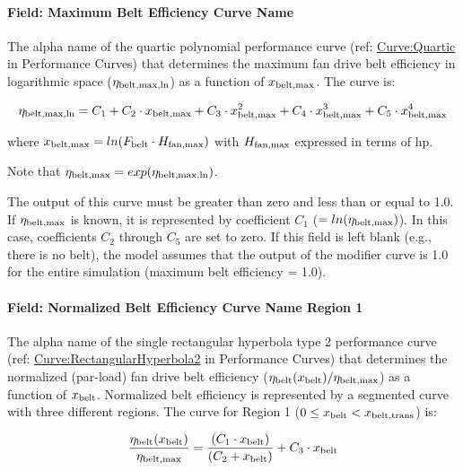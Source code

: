 \paragraph{Field: Maximum Belt Efficiency Curve Name}\label{field-maximum-belt-efficiency-curve-name}

The alpha name of the quartic polynomial performance curve (ref: \hyperref[curvequartic]{Curve:Quartic} in Performance Curves) that determines the maximum fan drive belt efficiency in logarithmic space (\(\eta_{\rm{belt, max, ln}}\)) as a function of \(x_{\rm{belt, max}}\). The curve is:

\begin{equation}
\eta_{\rm{belt, max, ln}} = C_1 + C_2 \cdot x_{\rm{belt, max}} + C_3 \cdot x_{\rm{belt, max}}^2 + C_4 \cdot x_{\rm{belt, max}}^3 + C_5 \cdot x_{\rm{belt, max}}^4
\end{equation}

where \(x_{\rm{belt, max}} = ln(F_{\rm{belt}} \cdot H_{\rm{fan, max}})\) with \(H_{\rm{fan, max}}\) expressed in terms of hp.

Note that \(\eta_{\rm{belt, max}} = exp(\eta_{\rm{belt, max, ln}})\).

The output of this curve must be greater than zero and less than or equal to 1.0. If \(\eta_{\rm{belt, max}}\) is known, it is represented by coefficient \(C_1\) (\(= ln(\eta_{\rm{belt, max}})\)). In this case, coefficients \(C_2\) through \(C_5\) are set to zero. If this field is left blank (e.g., there is no belt), the model assumes that the output of the modifier curve is 1.0 for the entire simulation (maximum belt efficiency = 1.0).

\paragraph{Field: Normalized Belt Efficiency Curve Name Region 1}\label{field-normalized-belt-efficiency-curve-name-region-1}

The alpha name of the single rectangular hyperbola type 2 performance curve (ref: \hyperref[curverectangularhyperbola2]{Curve:RectangularHyperbola2} in Performance Curves) that determines the normalized (par-load) fan drive belt efficiency (\(\eta_{\rm{belt}}(x_{\rm{belt}}) / \eta_{\rm{belt, max}}\)) as a function of \(x_{\rm{belt}}\). Normalized belt efficiency is represented by a segmented curve with three different regions. The curve for Region 1 (\(0 \le x_{\rm{belt}} < x_{\rm{belt, trans}}\)) is:

\begin{equation}
  \frac{\eta_{\rm{belt}} ( x_{\rm{belt}} )}{\eta_{\rm{belt, max}}} = \frac{(C_1 \cdot x_{\rm{belt}})}{(C_2 + x_{\rm{belt}})} + C_3 \cdot x_{\rm{belt}}
\end{equation}

